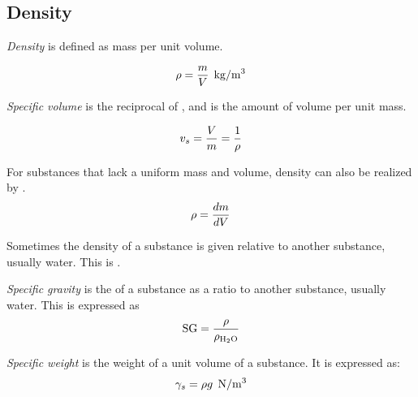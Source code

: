 \subsection{Density}\label{subsec:Density}
\begin{definition}[Density]\label{def:Density}
  \emph{Density} is defined as mass per unit volume.

  \begin{equation}\label{eq:Density}
    \Density = \frac{\Mass}{\Volume} \:\: \si[per-mode=symbol]{\kilo\gram\per\meter\cubed}
  \end{equation}
\end{definition}

\begin{definition}\label{def:Specific_Volume}
  \emph{Specific volume} is the reciprocal of , and is the amount of volume per unit mass.

  \begin{equation}\label{eq:Specific_Volume}
    \SpecificVolume = \frac{\Volume}{\Mass} = \frac{1}{\Density}
  \end{equation}
\end{definition}

For substances that lack a uniform mass and volume, density can also be realized by .
\begin{equation}\label{eq:Differential_Density}
  \Density = \frac{d \Mass}{d \Volume}
\end{equation}

Sometimes the density of a substance is given relative to another substance, usually water.
This is .
\begin{definition}\label{def:Specific_Gravity}
  \emph{Specific gravity} is the  of a substance as a ratio to another substance, usually water.
  This is expressed as
  \begin{equation}\label{eq:Specific_Gravity}
    \SpecificGravity = \frac{\Density}{\Density_{\mathrm{H_{2}O}}}
  \end{equation}
\end{definition}

\begin{definition}\label{def:Specific_Weight}
  \emph{Specific weight} is the weight of a unit volume of a substance.
  It is expressed as:
  \begin{equation}\label{eq:Specific_Weight}
    \SpecificWeight = \Density \Gravity \:\: \si[per-mode=symbol]{\newton\per\meter\cubed}
  \end{equation}
\end{definition}


